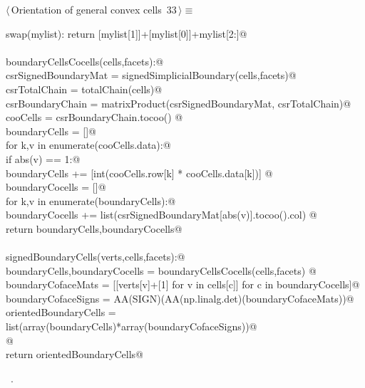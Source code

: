 \documentclass[11pt,oneside]{article}	%
\begin{document}
\begin{flushleft} \small \label{scrap53}
\protect{}$\langle\,$Orientation of general convex cells\nobreak\ {\footnotesize 33}$\,\rangle\equiv$
\vspace{-1ex}
\begin{list}{}{} \item
\mbox{}\verb@def swap(mylist): return [mylist[1]]+[mylist[0]]+mylist[2:]@\\
\mbox{}\verb@@\\
\mbox{}\verb@def boundaryCellsCocells(cells,facets):@\\
\mbox{}\verb@   csrSignedBoundaryMat = signedSimplicialBoundary(cells,facets)@\\
\mbox{}\verb@   csrTotalChain = totalChain(cells)@\\
\mbox{}\verb@   csrBoundaryChain = matrixProduct(csrSignedBoundaryMat, csrTotalChain)@\\
\mbox{}\verb@   cooCells = csrBoundaryChain.tocoo() @\\
\mbox{}\verb@   boundaryCells = []@\\
\mbox{}\verb@   for k,v in enumerate(cooCells.data):@\\
\mbox{}\verb@      if abs(v) == 1:@\\
\mbox{}\verb@         boundaryCells += [int(cooCells.row[k] * cooCells.data[k])]        @\\
\mbox{}\verb@   boundaryCocells = []@\\
\mbox{}\verb@   for k,v in enumerate(boundaryCells):@\\
\mbox{}\verb@      boundaryCocells += list(csrSignedBoundaryMat[abs(v)].tocoo().col)    @\\
\mbox{}\verb@   return boundaryCells,boundaryCocells@\\
\mbox{}\verb@@\\
\mbox{}\verb@def signedBoundaryCells(verts,cells,facets):@\\
\mbox{}\verb@   boundaryCells,boundaryCocells = boundaryCellsCocells(cells,facets)      @\\
\mbox{}\verb@   boundaryCofaceMats = [[verts[v]+[1] for v in cells[c]] for c in boundaryCocells]@\\
\mbox{}\verb@   boundaryCofaceSigns = AA(SIGN)(AA(np.linalg.det)(boundaryCofaceMats))@\\
\mbox{}\verb@   orientedBoundaryCells = list(array(boundaryCells)*array(boundaryCofaceSigns))@\\
\mbox{}\verb@   @\\
\mbox{}\verb@   return orientedBoundaryCells@\\
\mbox{}\verb@@{\NWsep}
\end{list}
\vspace{-1ex}
\footnotesize\addtolength{\baselineskip}{-1ex}
\begin{list}{}{\setlength{\itemsep}{-\parsep}\setlength{\itemindent}{-\leftmargin}}
\item \NWtxtMacroRefIn\ .
\end{list}
\end{flushleft}
\end{document}
